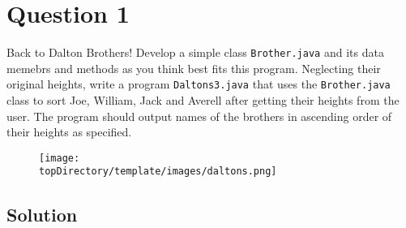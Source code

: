 %
%
%
%

\section*{Question 1}
Back to Dalton Brothers! Develop a simple class \texttt{Brother.java} and its data memebrs and methods as you think best fits this program. Neglecting their original heights, write a program \texttt{Daltons3.java} that uses the \texttt{Brother.java} class to sort Joe, William, Jack and Averell after getting their heights from the user. The program should output names of the brothers in ascending order of their heights as specified.

\begin{figure}[H]\centering
\texttt{[image: \\topDirectory/template/images/daltons.png]}
\end{figure}

\subsection*{Solution}

